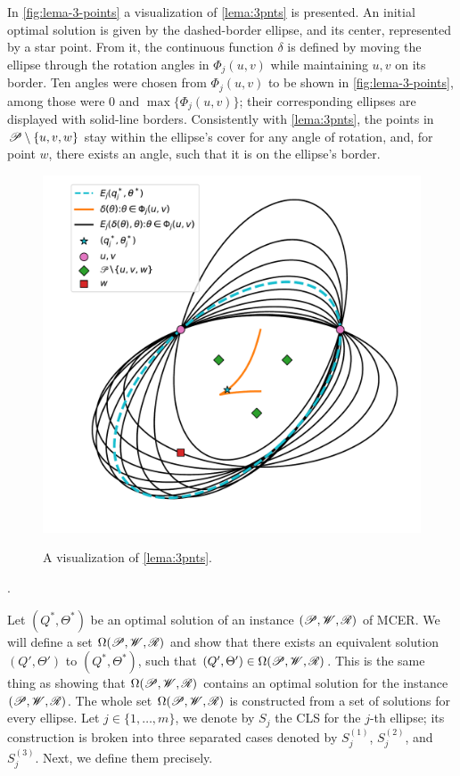 In \autoref{fig:lema-3-points} a visualization of \autoref{lema:3pnts} is presented.
An initial optimal solution is given by the dashed-border ellipse, and its center, represented by a star point. From it, the continuous function $\delta$ is defined by moving the ellipse through the rotation angles in $\Phi_j(u,v)$ while maintaining $u, v$ on its border. Ten angles were chosen from $\Phi_j(u,v)$ to be shown in \autoref{fig:lema-3-points}, among those were $0$ and $\max\{\Phi_j(u,v)\}$; their corresponding ellipses are displayed with solid-line borders.
Consistently with \autoref{lema:3pnts}, the points in $\mathscr{P} \setminus \{u, v, w\}$ stay within the ellipse's cover for any angle of rotation, and, for point $w$, there exists an angle, such that it is on the ellipse's border.  

\begin{figure}[H]
	\centering
	\caption{A visualization of \autoref{lema:3pnts}.}
	\includegraphics[scale=.6]{tex/figures/lema-3-points}
	\fautor
	\label{fig:lema-3-points}
\end{figure}.

Let $(Q^*, \Theta^*)$ be an optimal solution of an instance $(\mathscr{P}, \mathscr{W}, \mathscr{R})$ of MCER. We will define a set $\Omega(\mathscr{P}, \mathscr{W}, \mathscr{R})$ and show that there exists an equivalent solution $(Q', \Theta')$ to  $(Q^*, \Theta^*)$, such that $(Q', \Theta') \in \Omega(\mathscr{P}, \mathscr{W}, \mathscr{R})$. This is the same thing as showing that $\Omega(\mathscr{P}, \mathscr{W}, \mathscr{R})$ contains an optimal solution for the instance $(\mathscr{P}, \mathscr{W}, \mathscr{R})$.
The whole set $\Omega(\mathscr{P}, \mathscr{W}, \mathscr{R})$ is constructed from a set of solutions for every ellipse. Let $j\in\{1, \dots, m\}$, we denote by $S_j$ the CLS for the $j$-th ellipse; its construction is broken into three separated cases denoted by $S_j^{(1)}$, $S_j^{(2)}$, and $S_j^{(3)}$. Next, we define them precisely.


